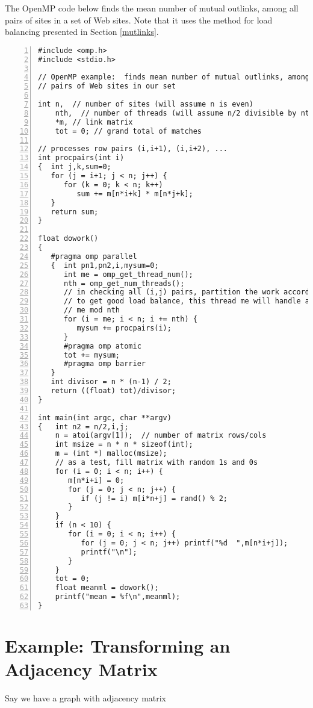 The OpenMP code below finds the mean number of mutual outlinks, among
all pairs of sites in a set of Web sites.  Note that it uses the method
for load balancing presented in Section \ref{mutlinks}.

\begin{Verbatim}[fontsize=\relsize{-2},numbers=left]
#include <omp.h>
#include <stdio.h>

// OpenMP example:  finds mean number of mutual outlinks, among all
// pairs of Web sites in our set

int n,  // number of sites (will assume n is even)
    nth,  // number of threads (will assume n/2 divisible by nth)
    *m, // link matrix
    tot = 0; // grand total of matches

// processes row pairs (i,i+1), (i,i+2), ...
int procpairs(int i)
{  int j,k,sum=0;
   for (j = i+1; j < n; j++) {
      for (k = 0; k < n; k++)
         sum += m[n*i+k] * m[n*j+k];
   }
   return sum;
}

float dowork()
{
   #pragma omp parallel
   {  int pn1,pn2,i,mysum=0;
      int me = omp_get_thread_num();
      nth = omp_get_num_threads();
      // in checking all (i,j) pairs, partition the work according to i;
      // to get good load balance, this thread me will handle all i that equal
      // me mod nth
      for (i = me; i < n; i += nth) {
         mysum += procpairs(i);
      }
      #pragma omp atomic
      tot += mysum;
      #pragma omp barrier
   }
   int divisor = n * (n-1) / 2;
   return ((float) tot)/divisor;
}

int main(int argc, char **argv)
{   int n2 = n/2,i,j;
    n = atoi(argv[1]);  // number of matrix rows/cols
    int msize = n * n * sizeof(int);
    m = (int *) malloc(msize);
    // as a test, fill matrix with random 1s and 0s
    for (i = 0; i < n; i++) {
       m[n*i+i] = 0;
       for (j = 0; j < n; j++) {
          if (j != i) m[i*n+j] = rand() % 2;
       }
    }
    if (n < 10) {
       for (i = 0; i < n; i++) {
          for (j = 0; j < n; j++) printf("%d  ",m[n*i+j]);
          printf("\n");
       }
    }
    tot = 0;
    float meanml = dowork();
    printf("mean = %f\n",meanml);
}
\end{Verbatim}

\section{Example:  Transforming an Adjacency Matrix}
\label{transgraph}

Say we have a graph with adjacency matrix

